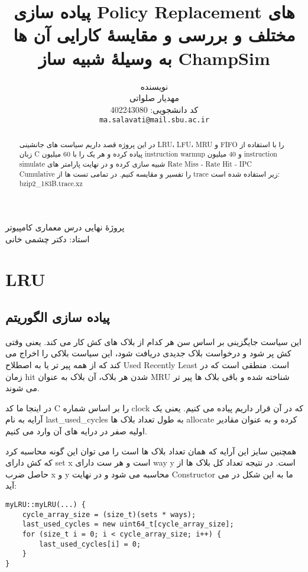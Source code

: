 \documentclass[17pt]{article}
\title{پیاده سازی Policy Replacement های مختلف و بررسی و مقایسهٔ کارایی آن ها به وسیلهٔ شبیه ساز ChampSim}
\author{%
  \begin{tabular}{@{}c@{}}
    نویسنده‌\\
    مهدیار صلواتی\\
    کد دانشجویی: 402243080\\
    \texttt{ma.salavati@mail.sbu.ac.ir}
  \end{tabular}%
}
\begin{document}
\begin{minipage}{0.1\textwidth}%

\end{minipage}%
\hfill%
\begin{minipage}{0.9\textwidth}\raggedleft
 پروژهٔ نهایی درس معماری کامپیوتر\\
استاد: دکتر چشمی خانی\\
\end{minipage}


\makepertitle


\begin{abstract}
در این پروژه قصد داریم سیاست های جانشینی LRU، LFU، MRU و FIFO را با استفاده از زبان C پیاده کرده و هر یک را با 60 میلیون instruction warmup و 40 میلیون instruction simulate شبیه سازی کرده و در نهایت پارامتر های Rate Miss - Rate Hit - IPC Cumulative را تفسیر و مقایسه کنیم.
در تمامی تست ها از trace زیر استفاده شده است:
bzip2\_183B.trace.xz
\end{abstract}


\section{LRU}
\subsection{پیاده سازی الگوریتم}
این سیاست جایگزینی بر اساس سن هر کدام از بلاک های کش کار می کند. یعنی وقتی کش پر شود و درخواست بلاک جدیدی دریافت شود، این سیاست بلاکی را اخراج می کند که از همه پیر تر یا به اصطلاح Used Recently Least است.
منطقی است که در زمان hit شدن هر بلاک، آن بلاک به عنوان MRU شناخته شده و باقی بلاک ها پیر تر می شوند.

در اینجا ما کد C را بر اساس شماره clock که در آن قرار داریم پیاده می کنیم. یعنی یک آرایه به نام last\_used\_cycles به طول تعداد بلاک ها allocate کرده و به عنوان مقادیر اولیه صفر در درایه های آن وارد می کنیم.


همچنین سایز این آرایه که همان تعداد بلاک ها است را می توان این گونه محاسبه کرد که کش دارای set x است و هر ست دارای way y است. در نتیجه تعداد کل بلاک ها از حاصل ضرب x و y محاسبه می شود و در نهایت Constructor ما به این شکل در می آید:

\begin{LTR}
\begin{lstlisting}
myLRU::myLRU(...) {
    cycle_array_size = (size_t)(sets * ways);
    last_used_cycles = new uint64_t[cycle_array_size];
    for (size_t i = 0; i < cycle_array_size; i++) {
        last_used_cycles[i] = 0;
    }
}
\end{lstlisting}
\end{LTR}
\end{document}
